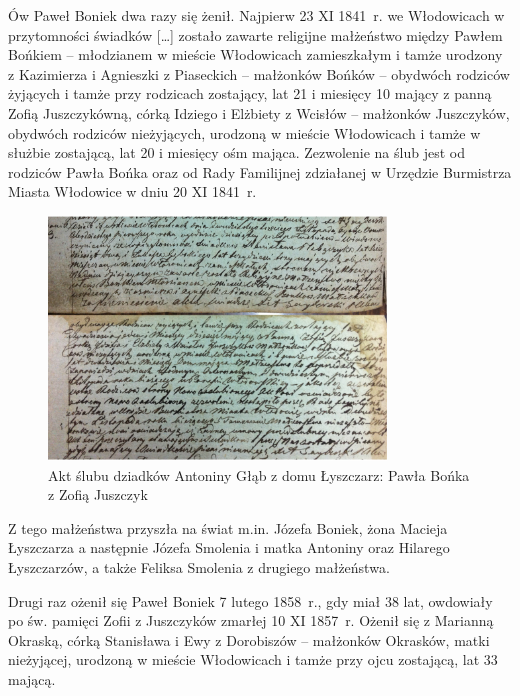 
Ów Paweł Boniek dwa razy się żenił. Najpierw 23 XI 1841~r. we Włodowicach w przytomności świadków […] zostało zawarte religijne małżeństwo między Pawłem Bońkiem -- młodzianem w mieście Włodowicach zamieszkałym i tamże urodzony z Kazimierza i Agnieszki z Piaseckich -- małżonków Bońków -- obydwóch rodziców żyjących i tamże przy rodzicach zostający, lat 21 i miesięcy 10 mający z panną Zofią Juszczykówną, córką Idziego i Elżbiety z Wcisłów -- małżonków Juszczyków, obydwóch rodziców nieżyjących, urodzoną w mieście Włodowicach i tamże w służbie zostającą, lat 20 i miesięcy ośm mająca. Zezwolenie na ślub jest od rodziców Pawła Bońka oraz od Rady Familijnej zdziałanej w Urzędzie Burmistrza Miasta Włodowice w dniu 20 XI 1841~r.

\begin{figure}[!h]
\begin{center}
\includegraphics[width=0.8\textwidth]{zdjecia/akt_slubu_pawla_bonka_i_zofii_juszczyk.jpg}
\caption[Akt ślubu Pawła Bońka z Zofią Juszczyk]{Akt ślubu dziadków Antoniny Głąb z domu Łyszczarz: Pawła Bońka z Zofią Juszczyk}
\label{rys:akt_slubu_pawla_bonka_i_zofii_juszczyk}
\end{center}
\end{figure}

Z tego małżeństwa przyszła na świat m.in. Józefa Boniek, żona Macieja Łyszczarza a następnie Józefa Smolenia i matka Antoniny oraz Hilarego Łyszczarzów, a także Feliksa Smolenia z drugiego małżeństwa.

Drugi raz ożenił się Paweł Boniek 7 lutego 1858~r., gdy miał 38 lat, owdowiały po św. pamięci Zofii z Juszczyków zmarłej 10 XI 1857~r. Ożenił się z Marianną Okraską, córką Stanisława i Ewy z Dorobiszów – małżonków Okrasków, matki nieżyjącej, urodzoną w mieście Włodowicach i tamże przy ojcu zostającą, lat 33 mającą. 

